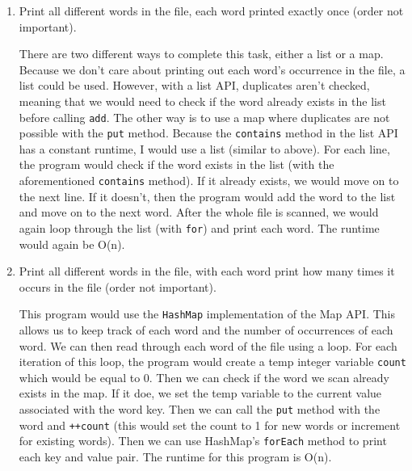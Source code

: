 \documentclass[letterpaper, 11pt]{article}
\begin{document}
\begin{enumerate}
\begin{enumerate}
        \item Print all different words in the file, each word printed exactly once (order not important).

        There are two different ways to complete this task, either a list or a map. Because we don't care about printing out each word's occurrence in the file, a list could be used. However, with a list API, duplicates aren't checked, meaning that we would need to check if the word already exists in the list before calling \texttt{add}. The other way is to use a map where duplicates are not possible with the \texttt{put} method. Because the \texttt{contains} method in the list API has a constant runtime, I would use a list (similar to above). For each line, the program would check if the word exists in the list (with the aforementioned \texttt{contains} method). If it already exists, we would move on to the next line. If it doesn't, then the program would add the word to the list and move on to the next word. After the whole file is scanned, we would again loop through the list (with \texttt{for}) and print each word. The runtime would again be O(n).
        
        \item Print all different words in the file, with each word print how many times it occurs in the file (order not important).

        This program would use the \texttt{HashMap} implementation of the Map API. This allows us to keep track of each word and the number of occurrences of each word. We can then read through each word of the file using a loop. For each iteration of this loop, the program would create a temp integer variable \texttt{count} which would be equal to 0. Then we can check if the word we scan already exists in the map. If it doe, we set the temp variable to the current value associated with the word key. Then we can call the \texttt{put} method with the word and \texttt{++count} (this would set the count to 1 for new words or increment for existing words). Then we can use HashMap's \texttt{forEach} method to print each key and value pair. The runtime for this program is O(n).
        
    \end{enumerate}
\end{enumerate}
\end{document}
